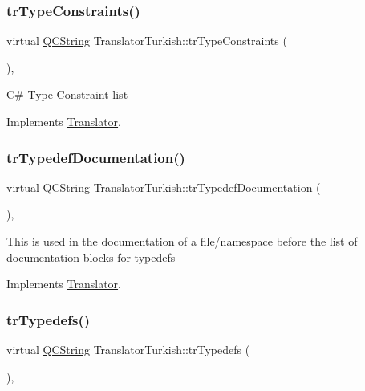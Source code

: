 \subsubsection{\texorpdfstring{trTypeConstraints()}{trTypeConstraints()}}
{\footnotesize\ttfamily virtual \mbox{\hyperlink{class_q_c_string}{Q\+C\+String}} Translator\+Turkish\+::tr\+Type\+Constraints (\begin{DoxyParamCaption}{ }\end{DoxyParamCaption})\hspace{0.3cm}{\ttfamily [inline]}, {\ttfamily [virtual]}}

\mbox{\hyperlink{class_c}{C}}\# Type Constraint list 

Implements \mbox{\hyperlink{class_translator}{Translator}}.

\mbox{\label{class_translator_turkish_a79297c1dd1cde1ad3e6e0650d0a70dcc}} 
\subsubsection{\texorpdfstring{trTypedefDocumentation()}{trTypedefDocumentation()}}
{\footnotesize\ttfamily virtual \mbox{\hyperlink{class_q_c_string}{Q\+C\+String}} Translator\+Turkish\+::tr\+Typedef\+Documentation (\begin{DoxyParamCaption}{ }\end{DoxyParamCaption})\hspace{0.3cm}{\ttfamily [inline]}, {\ttfamily [virtual]}}

This is used in the documentation of a file/namespace before the list of documentation blocks for typedefs 

Implements \mbox{\hyperlink{class_translator}{Translator}}.

\mbox{\label{class_translator_turkish_a109d4e25b24774708acbe3cc6ea6c63e}} 
\subsubsection{\texorpdfstring{trTypedefs()}{trTypedefs()}}
{\footnotesize\ttfamily virtual \mbox{\hyperlink{class_q_c_string}{Q\+C\+String}} Translator\+Turkish\+::tr\+Typedefs (\begin{DoxyParamCaption}{ }\end{DoxyParamCaption})\hspace{0.3cm}{\ttfamily [inline]}, {\ttfamily [virtual]}}

